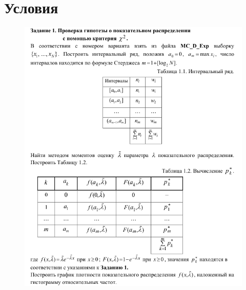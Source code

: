 \section{Условия}
\label{cha:tasks}

\begin{figure}[h!]
\centering%
\includegraphics[height=0.8\textheight]{../latex/inc/generated/img/task1.png}%
\end{figure}
\clearpage



